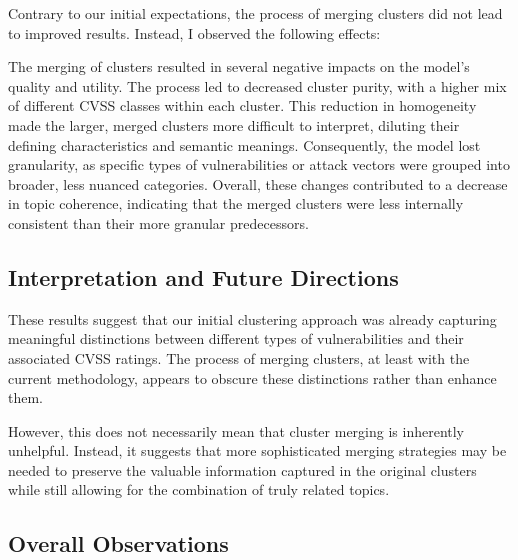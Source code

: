 \documentclass[12pt]{article}
\begin{document}
Contrary to our initial expectations, the process of merging clusters did not lead to improved
results. Instead, I observed the following effects:

The merging of clusters resulted in several negative impacts on the model's quality and utility. The
process led to decreased cluster purity, with a higher mix of different CVSS classes within each
cluster. This reduction in homogeneity made the larger, merged clusters more difficult to interpret,
diluting their defining characteristics and semantic meanings. Consequently, the model lost
granularity, as specific types of vulnerabilities or attack vectors were grouped into broader, less
nuanced categories. Overall, these changes contributed to a decrease in topic coherence, indicating
that the merged clusters were less internally consistent than their more granular predecessors.


\subsection{Interpretation and Future Directions}

These results suggest that our initial clustering approach was already capturing meaningful
distinctions between different types of vulnerabilities and their associated CVSS ratings. The
process of merging clusters, at least with the current methodology, appears to obscure these
distinctions rather than enhance them.

However, this does not necessarily mean that cluster merging is inherently unhelpful. Instead, it
suggests that more sophisticated merging strategies may be needed to preserve the valuable
information captured in the original clusters while still allowing for the combination of truly
related topics.

\subsection{Overall Observations}
\end{document}
